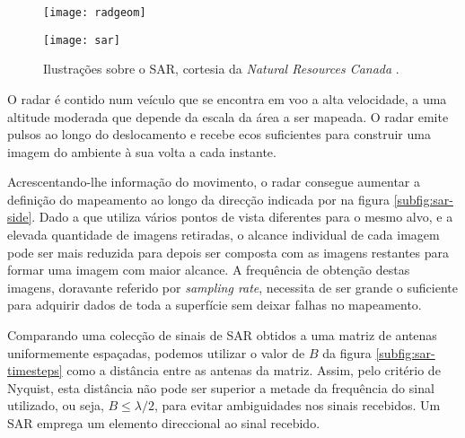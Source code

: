 \documentclass[purist,portuguese]{ist-report}
\begin{document}
\begin{figure}[ht]
	\centering
	\hspace*{\fill}
	\begin{minipage}[t]{0.43\textwidth}
		\centering
		\texttt{[image: radgeom]}
		\label{subfig:sar-side}
	\end{minipage}
	\hfill
	\begin{minipage}[t]{0.43\textwidth}
		\centering
		\texttt{[image: sar]}
		\label{subfig:sar-timesteps}
	\end{minipage}
	\hspace*{\fill}
	\caption{Ilustrações sobre o SAR, cortesia da \textit{Natural Resources Canada} \cite{nrcan}.}
	\label{fig:nrcan}
\end{figure}

O radar é contido num veículo que se encontra em voo a alta velocidade, a uma altitude moderada que depende da escala da área a ser mapeada. O radar emite pulsos ao longo do deslocamento e recebe ecos suficientes para construir uma imagem do ambiente à sua volta a cada instante.

Acrescentando-lhe informação do movimento, o radar consegue aumentar a definição do mapeamento ao longo da direcção indicada por  na figura \ref{subfig:sar-side}. Dado a que utiliza vários pontos de vista diferentes para o mesmo alvo, e a elevada quantidade de imagens retiradas, o alcance individual de cada imagem pode ser mais reduzida para depois ser composta com as imagens restantes para formar uma imagem com maior alcance. A frequência de obtenção destas imagens, doravante referido por \textit{sampling rate}, necessita de ser grande o suficiente para adquirir dados de toda a superfície sem deixar falhas no mapeamento.

Comparando uma colecção de sinais de SAR obtidos a uma matriz de antenas uniformemente espaçadas, podemos utilizar o valor de $B$ da figura \ref{subfig:sar-timesteps} como a distância entre as antenas da matriz. Assim, pelo critério de Nyquist, esta distância não pode ser superior a metade da frequência do sinal utilizado, ou seja, $B \leq \lambda/2$, para evitar ambiguidades nos sinais recebidos. Um SAR emprega um elemento direccional ao sinal recebido. 
\end{document}

